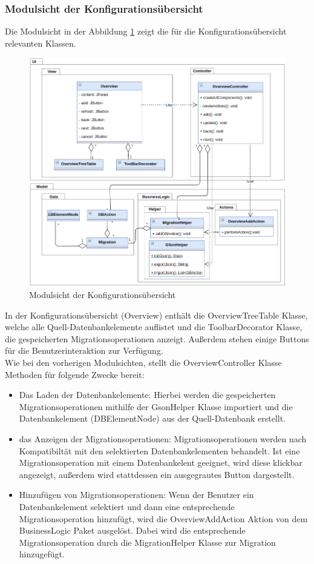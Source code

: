 	\subsubsection{Modulsicht der Konfigurationsübersicht}
	Die Modulsicht in der Abbildung \ref{img:modulsicht-overview} zeigt die für die Konfigurationsübersicht relevanten Klassen.
	\begin{figure}[H]
		\centering
		\includegraphics[width=\textwidth]{images/sichten/modulsicht-overview}
		\caption{Modulsicht der Konfigurationsübersicht}
		\label{img:modulsicht-overview}
	\end{figure}
	In der Konfigurationsübersicht (Overview) enthält die OverviewTreeTable Klasse, welche alle Quell-Datenbankelemente auflistet und die ToolbarDecorator Klasse, die gespeicherten Migrationsoperationen anzeigt. Außerdem stehen einige Buttons für die Benutzerinteraktion zur Verfügung. \\
	Wie bei den vorherigen Modulsichten, stellt die OverviewController Klasse Methoden für folgende Zwecke bereit:
	\begin{itemize}
		\item Das Laden der Datenbankelemente: Hierbei werden die gespeicherten Migrationsoperationen mithilfe der GsonHelper Klasse importiert und die Datenbankelement (DBElementNode) aus der Quell-Datenbank erstellt.
		\item das Anzeigen der Migrationsoperationen: Migrationsoperationen werden nach Kompatibiltät mit den selektierten Datenbankelementen behandelt. Ist eine Migrationsoperation mit einem Datenbankelent geeignet, wird diese klickbar angezeigt, außerdem wird stattdessen ein ausgegrautes Button dargestellt.
		\item Hinzufügen von Migrationsoperationen: Wenn der Benutzer ein Datenbankelement selektiert und dann eine entsprechende Migrationsoperation hinzufügt, wird die OverviewAddAction Aktion von dem BusinessLogic Paket ausgelöst. Dabei wird die entsprechende Migrationsoperation durch die MigrationHelper Klasse zur Migration hinzugefügt.
	\end{itemize}
	
